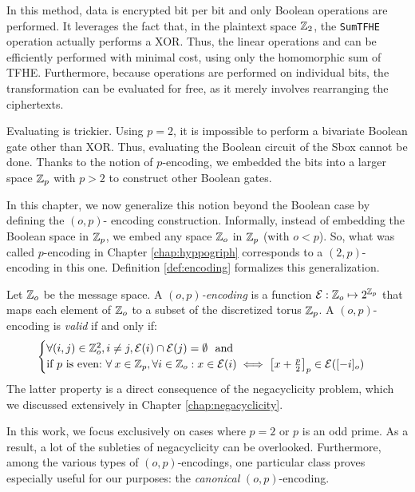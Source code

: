 In this method, data is encrypted bit per bit and only Boolean operations are performed. It leverages the fact that, in the plaintext space $\mathbb{Z}_2$, the \texttt{SumTFHE} operation actually performs a XOR. Thus, the linear operations \MixColumns and \AddRoundKey can be efficiently performed with minimal cost, using only the homomorphic sum of TFHE.
%
Furthermore, because operations are performed on individual bits, the \ShiftRows transformation can be evaluated for free, as it merely involves rearranging the ciphertexts.

Evaluating \SubBytes is trickier. Using $p=2$, it is impossible to perform a bivariate Boolean gate other than XOR. Thus, evaluating the Boolean circuit of the Sbox cannot be done. Thanks to the notion of $p$-encoding, we embedded the bits into a larger space $\mathbb{Z}_p$ with $p > 2$ to construct other Boolean gates.  

In this chapter, we now generalize this notion beyond the Boolean case by defining the $(o, p)$- encoding construction. Informally, instead of embedding the Boolean space in $\mathbb{Z}_p$, we embed any space $\mathbb{Z}_o$ in $\mathbb{Z}_p$ (with $o < p$). So, what was called $p$-encoding in Chapter \ref{chap:hyppogriph} corresponds to a $(2, p)$-encoding in this one.
%
Definition \ref{def:encoding} formalizes this generalization.

\begin{definition}[$(o, p)$-encoding]
	Let $\mathbb{Z}_o$ be the message space. A \emph{$(o, p)$-encoding} is a function $\mathcal{E}: \mathbb{Z}_o \mapsto 2^{\mathbb{Z}_p}$ that maps each element of $\mathbb{Z}_o$ to a subset of the discretized torus $\mathbb{Z}_p$. A $(o, p)$-encoding is \emph{valid} if and only if:
	\begin{equation}
		\begin{cases}
			\forall (i, j) \in \mathbb{Z}_o^2, i \ne j, \mathcal{E}(i) \cap \mathcal{E}(j) = \emptyset~\text{ and}\\
			\text{if $p$ is even:} ~\forall \:x \in \mathbb Z_p, \forall i \in \mathbb{Z}_o: x \in \mathcal{E}(i) \iff \left [ x + \frac p 2 \right ]_p \in \mathcal{E}([-i]_o)
		\end{cases}
		\label{def:validity}
	\end{equation}
	The latter property is a direct consequence of the negacyclicity problem, which we discussed extensively in Chapter \ref{chap:negacyclicity}.
	\label{def:encoding}
\end{definition}

In this work, we focus exclusively on cases where $p=2$ or $p$ is an odd prime. As a result, a lot of the subleties of negacyclicity can be overlooked. Furthermore, among the various types of $(o, p)$-encodings, one particular class proves especially useful for our purposes: the \textit{canonical} $(o, p)$-encoding.

